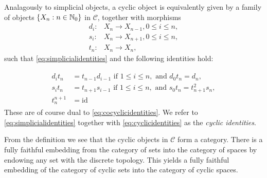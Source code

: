 Analagously to simplicial objects, a cyclic object is equivalently given
by a family of objects $\{X_n:n\in \mathbb{N}_0\}$ in $\mathcal{C}$,
together with morphisms
\begin{align}
d_i: &X_n\to X_{n-1}, 0\le i\le n,\\
s_i: &X_n \to X_{n+1}, 0\le i \le n,\\
t_n: &X_n\to X_n,
\end{align} 
such that \eqref{eq:simplicialidentities} and the following
identities hold:

\begin{align}\label{eq:cyclicidentities}
\begin{split}
d_i t_n &=  t_{n-1} d_{i-1} \text{ if } 1\le i\le n, 
\text{ and }d_0 t_n = d_n,\\
s_i t_n &= t_{n+1} s_{i-1} \text{ if } 1\le i \le n,
\text{ and }s_0 t_n= t^2_{n+1} s_n,\\
t_n^{n+1} &= \mathrm{id}
\end{split}
\end{align}
These are of course dual to \eqref{eq:cocyclicidentities}.
We refer to \eqref{eq:simplicialidentities} together with
\eqref{eq:cyclicidentities} as the \textit{cyclic identities}.

From the definition we see that the cyclic objects in $\mathcal{C}$ form a category.
There is a fully faithful embedding from the category of
sets into the category of spaces
by endowing any set with the discrete topology. This
yields a fully faithful embedding of the category
of cyclic sets into the category of cyclic spaces.

